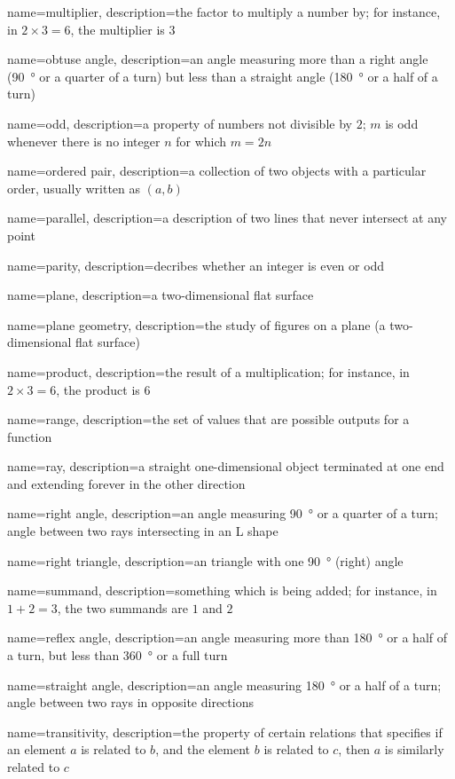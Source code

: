 {
  name=multiplier,
  description={the factor to multiply a number by; for instance, in
  $2\times3=6$, the multiplier is $3$}
}

{
  name=obtuse angle,
  description={an angle measuring more than a right angle (\SI{90}{\degree} or a
  quarter of a turn) but less than a straight angle (\SI{180}{\degree} or a half
  of a turn)}
}

{
  name=odd,
  description={a property of numbers not divisible by \(2\); \(m\) is odd
  whenever there is no integer \(n\) for which \(m = 2n\)}
}

{
  name=ordered pair,
  description={a collection of two objects with a particular order, usually
  written as \((a, b)\)}
}

{
  name=parallel,
  description={a description of two lines that never intersect at any point}
}

{
  name=parity,
  description={decribes whether an integer is even or odd}
}

{
  name=plane,
  description={a two-dimensional flat surface}
}

{
  name=plane geometry,
  description={the study of figures on a plane (a two-dimensional flat surface)}
}

{
  name=product,
  description={the result of a multiplication; for instance, in
  $2\times3=6$, the product is $6$}
}

{
  name=range,
  description={the set of values that are possible outputs for a function}
}

{
  name=ray,
  description={a straight one-dimensional object terminated at one end and
  extending forever in the other direction}
}

{
  name=right angle,
  description={an angle measuring \SI{90}{\degree} or a quarter of a turn; angle
  between two rays intersecting in an L shape}
}

{
  name=right triangle,
  description={an triangle with one \SI{90}{\degree} (right) angle}
}

{
  name=summand,
  description={something which is being added; for instance, in $1+2=3$,
  the two summands are $1$ and $2$}
}

{
  name=reflex angle,
  description={an angle measuring more than \SI{180}{\degree} or a half of a
  turn, but less than \SI{360}{\degree} or a full turn}
}

{
  name=straight angle,
  description={an angle measuring \SI{180}{\degree} or a half of a turn; angle
  between two rays in opposite directions}
}

{
  name=transitivity,
  description={the property of certain relations that specifies if an
  element $a$ is related to $b$, and the element $b$ is related to $c$,
  then $a$ is similarly related to $c$}
}
